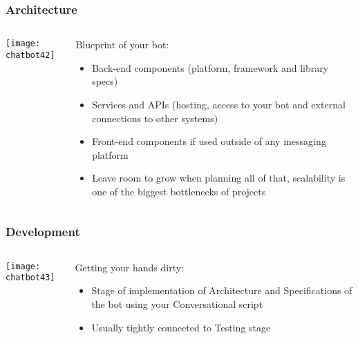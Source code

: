 \begin{frame}[fragile]\frametitle{Architecture}
    \begin{columns}
    \begin{column}[t]{0.5\linewidth}
\begin{center}
\texttt{[image: chatbot42]}
\end{center}
\end{column}
    \begin{column}[t]{0.5\linewidth}
 Blueprint of your bot:
\begin{itemize}
\item Back-end components (platform, framework and library specs)
\item Services and APIs (hosting, access to your bot and external connections to other systems)
\item Front-end components if used outside of any messaging platform
\item Leave room to grow when planning all of that, scalability is one of the biggest bottlenecks of projects
\end{itemize}
\end{column}
\end{columns}
\end{frame}


\begin{frame}[fragile]\frametitle{Development}
    \begin{columns}
    \begin{column}[t]{0.5\linewidth}
\begin{center}
\texttt{[image: chatbot43]}
\end{center}
\end{column}
    \begin{column}[t]{0.5\linewidth}
Getting your hands dirty:
\begin{itemize}
\item Stage of implementation of Architecture and Specifications of the bot using your Conversational script
\item Usually tightly connected to Testing stage
\end{itemize}
\end{column}
\end{columns}
\end{frame}

